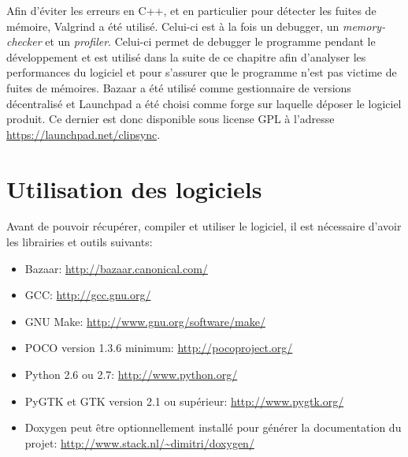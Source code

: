 Afin d'éviter les erreurs en C++, et en particulier pour détecter les fuites
de mémoire, Valgrind\cite{valgrind} a été utilisé. Celui-ci est à la fois un
debugger, un \emph{memory-checker} et un \emph{profiler}. Celui-ci permet
de debugger le programme pendant le développement et est utilisé dans la
suite de ce chapitre afin d'analyser les performances du logiciel et pour
s'assurer que le programme n'est pas victime de fuites de mémoires.
Bazaar\cite{bzr} a été utilisé comme gestionnaire de versions décentralisé et
Launchpad\cite{launchpad} a été choisi comme forge sur laquelle déposer le
logiciel produit. Ce dernier est donc disponible sous license GPL à l'adresse
\url{https://launchpad.net/clipsync}.

\section{Utilisation des logiciels}
Avant de pouvoir récupérer, compiler et utiliser le logiciel, il est nécessaire
d'avoir les librairies et outils suivants:
\begin{itemize}
\item Bazaar: \url{http://bazaar.canonical.com/}
\item GCC: \url{http://gcc.gnu.org/}
\item GNU Make: \url{http://www.gnu.org/software/make/}
\item POCO version 1.3.6 minimum: \url{http://pocoproject.org/}
\item Python 2.6 ou 2.7: \url{http://www.python.org/}
\item PyGTK et GTK version 2.1 ou supérieur: \url{http://www.pygtk.org/}
\item Doxygen peut être optionnellement installé pour générer la documentation
  du projet: \url{http://www.stack.nl/~dimitri/doxygen/}
\end{itemize}


